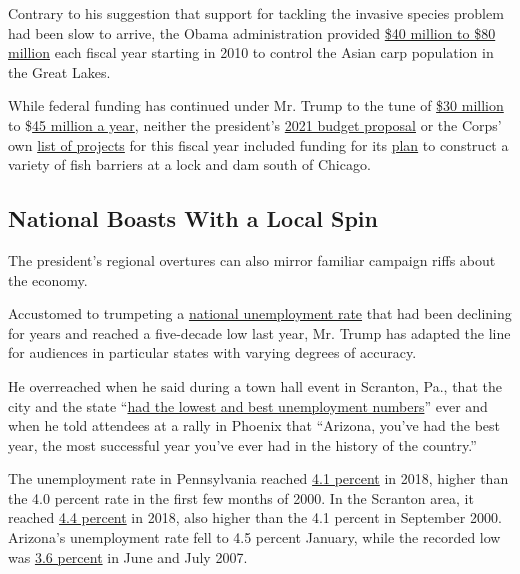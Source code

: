 Contrary to his suggestion that support for tackling the invasive
species problem had been slow to arrive, the Obama administration
provided
\href{https://www.everycrsreport.com/files/20171019_R41082_b2bd1e6cff8551e9d06dd4916d7076434cec8a5c.pdf\#page=23}{\$40
million to \$80 million} each fiscal year starting in 2010 to control
the Asian carp population in the Great Lakes.

While federal funding has continued under Mr. Trump to the tune of
\href{https://www.asiancarp.us/Documents/2019ActionPlan.pdf\#page=75}{\$30
million} to
\$\href{https://www.asiancarp.us/Documents/2019ActionPlan.pdf\#page=75}{45
million a year}, neither the president's
\href{https://www.lrc.usace.army.mil/Media/News-Releases/Article/2081447/presidents-fiscal-year-2021-budget-for-us-army-corps-of-engineers-civil-works-p/}{2021
budget proposal} or the Corps' own
\href{https://www.usace.army.mil/Portals/2/docs/civilworks/budget/FY\%202020\%20Work\%20Plan\%20Construction\%20Statement\%20of\%20Managers\%20FINAL.PDF}{list
of projects} for this fiscal year included funding for its
\href{https://usace.contentdm.oclc.org/utils/getfile/collection/p16021coll7/id/11399}{plan}
to construct a variety of fish barriers at a lock and dam south of
Chicago.

\hypertarget{national-boasts-with-a-local-spin}{%
\subsection{National Boasts With a Local
Spin}\label{national-boasts-with-a-local-spin}}

The president's regional overtures can also mirror familiar campaign
riffs about the economy.

Accustomed to trumpeting a
\href{https://data.bls.gov/timeseries/LNS14000000}{national unemployment
rate} that had been declining for years and reached a five-decade low
last year, Mr. Trump has adapted the line for audiences in particular
states with varying degrees of accuracy.

He overreached when he said during a town hall event in Scranton, Pa.,
that the city and the state
``\href{https://www.whitehouse.gov/briefings-statements/remarks-president-trump-fox-news-town-hall-scranton-pa/}{had
the lowest and best unemployment numbers}'' ever and when he told
attendees at a rally in Phoenix that ``Arizona, you've had the best
year, the most successful year you've ever had in the history of the
country.''

The unemployment rate in Pennsylvania reached
\href{https://data.bls.gov/timeseries/LASST420000000000003?amp\%253bdata_tool=XGtable\&output_view=data\&include_graphs=true}{4.1
percent} in 2018, higher than the 4.0 percent rate in the first few
months of 2000. In the Scranton area, it reached
\href{https://data.bls.gov/timeseries/LAUMT424254000000003?amp\%253bdata_tool=XGtable\&output_view=data\&include_graphs=true}{4.4
percent} in 2018, also higher than the 4.1 percent in September 2000.
Arizona's unemployment rate fell to 4.5 percent January, while the
recorded low was
\href{https://data.bls.gov/timeseries/LASST040000000000004?amp\%253bdata_tool=XGtable\&output_view=data\&include_graphs=true}{3.6
percent} in June and July 2007.

